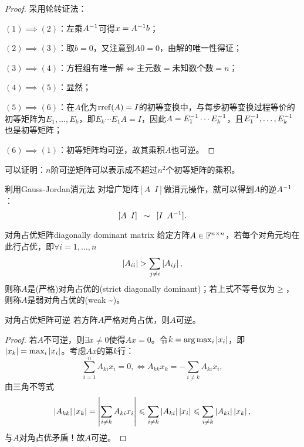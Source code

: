 \begin{proof}
	采用轮转证法：

	$(1)\implies(2)$：左乘$A^{-1}$可得$x=A^{-1} b$；

	$(2)\implies(3)$：取$b=0$，又注意到$A0=0$，由解的唯一性得证；

	$(3)\implies(4)$：方程组有唯一解$\iff$主元数$=$未知数个数$=n$；

	$(4)\implies(5)$：显然；

	$(5)\implies(6)$：在$A$化为$\operatorname{rref}(A)=I$的初等变换中，与每步初等变换过程等价的初等矩阵为$E_1,\ldots,E_k$，即$E_k\cdots E_1A=I$，因此$A=E_1^{-1}\cdots E_k^{-1}$，且$E_1^{-1},\ldots,E_k^{-1}$也是初等矩阵；

	$(6)\implies(1)$：初等矩阵均可逆，故其乘积$A$也可逆。
\end{proof}

\begin{remark}
	可以证明：$n$阶可逆矩阵可以表示成不超过$n^2$个初等矩阵的乘积。
\end{remark}

\begin{corollary}
	利用Gauss-Jordan消元法
	对增广矩阵$[A\enspace I]$做消元操作，就可以得到$A$的逆$A^{-1}$：
	\[
		[A\enspace I]\enspace\sim\enspace[I\enspace A^{-1}].
	\]
\end{corollary}

\begin{definition}
	{对角占优矩阵}{diagonally dominant matrix}
	给定方阵$A\in\mathbb F^{n\times n}$，若每个对角元均在此行占优，即$\forall i=1,\ldots,n$
	\begin{equation}
		\left\lvert A_{ii}\right\rvert>\sum_{j\neq i}\left\lvert A_{ij}\right\rvert,
	\end{equation}
	则称$A$是(严格)对角占优的(strict diagonally dominant)；若上式不等号仅为$\geq$，则称$A$是弱对角占优的(weak \textasciitilde)。
\end{definition}

\begin{theorem}
	{对角占优矩阵可逆}{}
	若方阵$A$严格对角占优，则$A$可逆。
\end{theorem}

\begin{proof}
	若$A$不可逆，则$\exists x\neq 0$使得$Ax=0$。令$k=\arg\max_i\left\lvert x_i\right\rvert$，即$\left\lvert x_k\right\rvert=\max_i\left\lvert x_i\right\rvert$。考虑$Ax$的第$k$行：
	\[
		\sum_{i=1}^nA_{ki}x_i=0,\iff A_{kk}x_k=-\sum_{i\neq k}A_{ki}x_i,
	\]
	由三角不等式
	\[
		\left\lvert A_{kk}\right\rvert\left\lvert x_k\right\rvert=\left\lvert\sum_{i\neq k}A_{ki}x_i\right\rvert\leqslant\sum_{i\neq k}\left\lvert A_{ki}\right\rvert\left\lvert x_i\right\rvert\leqslant\sum_{i\neq k}\left\lvert A_{ki}\right\rvert\left\lvert x_k\right\rvert,
	\]
	与$A$对角占优矛盾！故$A$可逆。
\end{proof}


